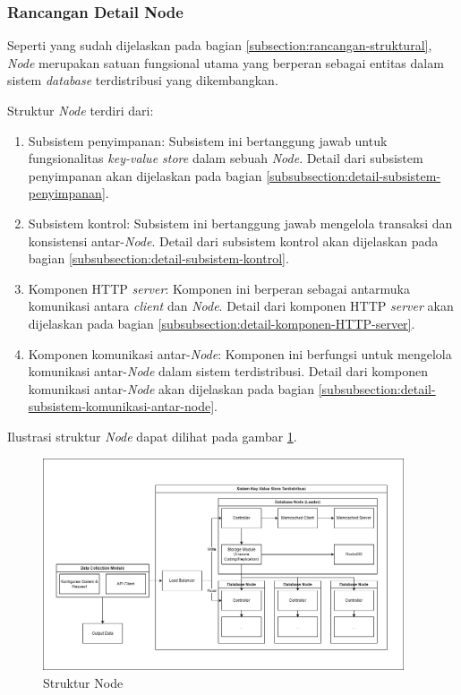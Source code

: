 \subsubsection{Rancangan Detail Node}
\label{subsubsection:detail-node}

Seperti yang sudah dijelaskan pada bagian \ref{subsection:rancangan-struktural}, \textit{Node} merupakan satuan fungsional utama yang berperan sebagai entitas dalam sistem \textit{database} terdistribusi yang dikembangkan.

Struktur \textit{Node} terdiri dari:

\begin{enumerate}
    \item Subsistem penyimpanan: Subsistem ini bertanggung jawab untuk fungsionalitas \textit{key-value store} dalam sebuah \textit{Node}. Detail dari subsistem penyimpanan akan dijelaskan pada bagian \ref{subsubsection:detail-subsistem-penyimpanan}.
    \item Subsistem kontrol: Subsistem ini bertanggung jawab mengelola transaksi dan konsistensi antar-\textit{Node}. Detail dari subsistem kontrol akan dijelaskan pada bagian \ref{subsubsection:detail-subsistem-kontrol}.
    \item Komponen HTTP \textit{server}: Komponen ini berperan sebagai antarmuka komunikasi antara \textit{client} dan \textit{Node}. Detail dari komponen HTTP \textit{server} akan dijelaskan pada bagian \ref{subsubsection:detail-komponen-HTTP-server}.
    \item Komponen komunikasi antar-\textit{Node}: Komponen ini berfungsi untuk mengelola komunikasi antar-\textit{Node} dalam sistem terdistribusi. Detail dari komponen komunikasi antar-\textit{Node} akan dijelaskan pada bagian \ref{subsubsection:detail-subsistem-komunikasi-antar-node}.
\end{enumerate}

Ilustrasi struktur \textit{Node} dapat dilihat pada gambar \ref{fig:node-structure}.

\begin{figure}[ht]
    \centering
    \includegraphics[width=0.95\textwidth]{resources/chapter-3/general-architecture.png}
    \caption{Struktur Node}
    \label{fig:node-structure}
\end{figure}